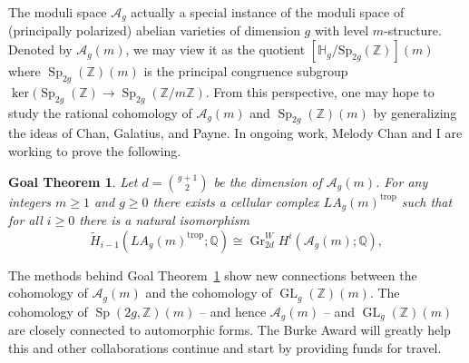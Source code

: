 \documentclass[11pt,reqno]{amsart}
\newtheorem{goalTheorem}[lemma]{Goal Theorem}
\theoremstyle{remark}
\newcommand{\Gr}{\operatorname{Gr}}
\newcommand{\GL}{{\operatorname{GL}}}
\newcommand{\Sp}{\operatorname{Sp}}
\newcommand{\trop}{\operatorname{trop}}
\newcommand{\cA}{\mathcal{A}}
\newcommand{\cM}{\mathcal{M}}
\newcommand{\Q}{\mathbb{Q}}
\newcommand{\Z}{\mathbb{Z}}
\begin{document}
%
%
%
%

The moduli space $\cA_{g}$ actually a special instance of the moduli space of (principally polarized) abelian varieties of dimension $g$ with level $m$-structure. Denoted by $\cA_{g}(m)$, we may view it as the quotient $[\mathbb{H}_g/\mathrm{Sp}_{2g}(\Z)](m)$  where $\Sp_{2g}(\Z)(m)$ is the principal congruence subgroup $\ker(\Sp_{2g}(\Z) \to \Sp_{2g}(\Z/m\Z)$. From this perspective, one may hope to study the rational cohomology of  $\cA_{g}(m)$ and $\Sp_{2g}(\Z)(m)$ by generalizing the ideas of Chan, Galatius, and Payne. In ongoing work, Melody Chan and I are working to prove the following.

\begin{goalTheorem}\label{goalThm:agm}
Let $d=\binom{g+1}{2}$ be the dimension of $\cA_{g}(m)$. For any integers $m\geq1$ and $g\geq0$ there exists a cellular complex $LA_{g}(m)^{\trop}$ such that for all $i\geq0$ there is a natural isomorphism
\[
\tilde{H}_{i-1}\left(LA_{g}(m)^{\trop};\Q\right) \cong \Gr_{2d}^W\!H^{i}\left(\cA_{g}(m);\mathbb{Q}\right),
\]
\end{goalTheorem}

The methods behind  Goal Theorem~\ref{goalThm:agm} show new connections between the cohomology of $\cA_{g}(m)$ and the cohomology of $\GL_{g}(\Z)(m)$. The cohomology of $\Sp(2g,\Z)(m)$ -- and hence  $\cA_{g}(m)$ -- and $\GL_{g}(\Z)(m)$ are closely connected to automorphic forms. The Burke Award will greatly help this and other collaborations continue and start by providing funds for travel.
\end{document}
